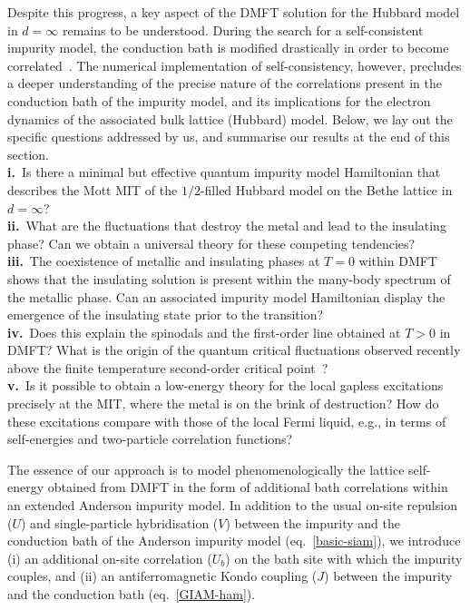 \documentclass{iopart}
\begin{document}
Despite this progress, a key aspect of the DMFT solution for the Hubbard model in $d=\infty$ remains to be understood. During the search for a self-consistent impurity model, the conduction bath is modified drastically in order to become correlated~\cite{held2008}. 
The numerical implementation of self-consistency, however, precludes a deeper understanding of the precise nature of the correlations present in the conduction bath of the impurity model, and its implications for the electron dynamics of the associated bulk lattice (Hubbard) model. 
Below, we lay out the specific questions addressed by us, and summarise our results at the end of this section.\\[5pt]
{\bf i.}~Is there a minimal but effective quantum impurity model Hamiltonian that describes the Mott MIT of the $1/2$-filled Hubbard model on the Bethe lattice in \(d=\infty\)?\\[5pt]
{\bf ii.}~What are the fluctuations that destroy the metal and lead to the insulating phase? Can we obtain a universal theory for these competing tendencies?\\[5pt]
{\bf iii.}~The coexistence of metallic and insulating phases at $T=0$ within DMFT shows that the insulating solution is present within the many-body spectrum of the metallic phase. Can an associated impurity model Hamiltonian display the emergence of the insulating state prior to the transition?\\[5pt]
{\bf iv.}~Does this explain the spinodals and the first-order line obtained at $T>0$ in DMFT? What is the origin of the quantum critical fluctuations observed recently above the finite temperature second-order critical point~\cite{terletska_mott_2011,vucicevic_2013}?\\[5pt]
{\bf v.}~Is it possible to obtain a low-energy theory for the local gapless excitations precisely at the MIT, where the metal is on the brink of destruction? How do these excitations compare with those of the local Fermi liquid, e.g., in terms of self-energies and two-particle correlation functions?\\
\par
The essence of our approach is to model phenomenologically the lattice self-energy obtained from DMFT in the form of additional bath correlations within an extended Anderson impurity model.
In addition to the usual on-site repulsion ($U$) and single-particle hybridisation ($V$) between the impurity and the conduction bath of the Anderson impurity model (eq.~\eqref{basic-siam}), we introduce (i) an additional on-site correlation ($U_{b}$) on the bath site with which the impurity couples, and (ii) an antiferromagnetic Kondo coupling ($J$) between the impurity and the conduction bath (eq.~\eqref{GIAM-ham}). 
\end{document}
